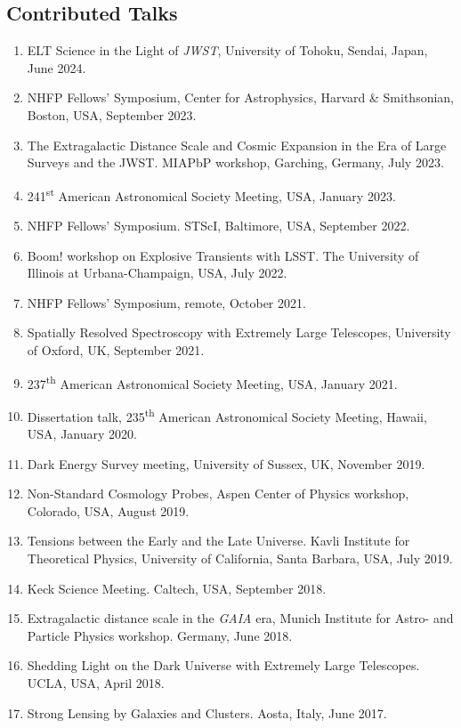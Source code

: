 \documentclass[margin, line]{res}
\begin{document}
\begin{resume}
\section{\sc Contributed Talks}
\begin{enumerate}
	\item ELT Science in the Light of \textit{JWST}, University of Tohoku, Sendai, Japan, June 2024.
	\item NHFP Fellows' Symposium, Center for Astrophysics, Harvard \& Smithsonian, Boston, USA, September 2023.
	\item The Extragalactic Distance Scale and Cosmic Expansion in the Era of Large Surveys and the JWST. MIAPbP workshop, Garching, Germany, July 2023. 
	\item 241\textsuperscript{st} American Astronomical Society Meeting, USA, January 2023.
	\item NHFP Fellows' Symposium. STScI, Baltimore, USA, September 2022.
	\item Boom! workshop on Explosive Transients with LSST. The University of Illinois at Urbana-Champaign, USA, July 2022.
	\item NHFP Fellows' Symposium, remote, October 2021.
	\item Spatially Resolved Spectroscopy with Extremely Large Telescopes, University of Oxford, UK, September 2021. %
	\item 237\textsuperscript{th} American Astronomical Society Meeting, USA, January 2021. %
	\item Dissertation talk, 235\textsuperscript{th} American Astronomical Society Meeting, Hawaii, USA, January 2020.
	\item Dark Energy Survey meeting, University of Sussex, UK, November 2019. %
	\item Non-Standard Cosmology Probes, Aspen Center of Physics workshop, Colorado, USA, August 2019.
	\item Tensions between the Early and the Late Universe. Kavli Institute for Theoretical Physics, University of California, Santa Barbara, USA, July 2019.
	\item Keck Science Meeting. Caltech, USA, September 2018.
	\item Extragalactic distance scale in the \textit{GAIA} era, Munich Institute for Astro- and Particle Physics workshop. Germany, June 2018.
	\item Shedding Light on the Dark Universe with Extremely Large Telescopes. UCLA, USA, April 2018.
	\item Strong Lensing by Galaxies and Clusters. Aosta, Italy, June 2017.
\end{enumerate}



\end{resume}
\end{document}
